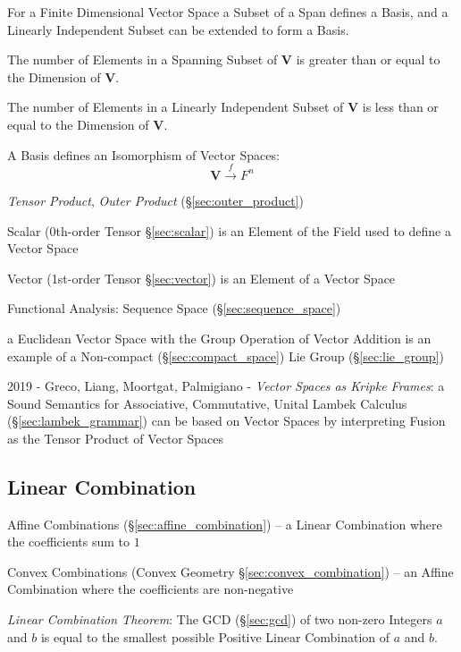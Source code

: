 For a Finite Dimensional Vector Space a Subset of a Span defines a
Basis, and a Linearly Independent Subset can be extended to form a
Basis.

The number of Elements in a Spanning Subset of $\mathbf{V}$ is greater
than or equal to the Dimension of $\mathbf{V}$.

The number of Elements in a Linearly Independent Subset of
$\mathbf{V}$ is less than or equal to the Dimension of $\mathbf{V}$.

A Basis defines an Isomorphism of Vector Spaces:
\[
    \mathbf{V} \xrightarrow{f} F^n
\]

\emph{Tensor Product}, \emph{Outer Product} (\S\ref{sec:outer_product})

Scalar (0th-order Tensor \S\ref{sec:scalar}) is an Element of the
Field used to define a Vector Space

Vector (1st-order Tensor \S\ref{sec:vector}) is an Element of a Vector
Space

Functional Analysis: Sequence Space (\S\ref{sec:sequence_space})

a Euclidean Vector Space with the Group Operation of Vector Addition is an
example of a Non-compact (\S\ref{sec:compact_space}) Lie Group
(\S\ref{sec:lie_group})

2019 - Greco, Liang, Moortgat, Palmigiano - \emph{Vector Spaces as Kripke
  Frames}: a Sound Semantics for Associative, Commutative, Unital Lambek
Calculus (\S\ref{sec:lambek_grammar}) can be based on Vector Spaces by
interpreting Fusion as the Tensor Product of Vector Spaces



\subsection{Linear Combination}\label{sec:linear_combination}

\fist Affine Combinations (\S\ref{sec:affine_combination}) -- a Linear
Combination where the coefficients sum to $1$

\fist Convex Combinations (Convex Geometry \S\ref{sec:convex_combination}) -- an
Affine Combination where the coefficients are non-negative

\emph{Linear Combination Theorem}: The GCD (\S\ref{sec:gcd}) of two non-zero
Integers $a$ and $b$ is equal to the smallest possible Positive Linear
Combination of $a$ and $b$.



